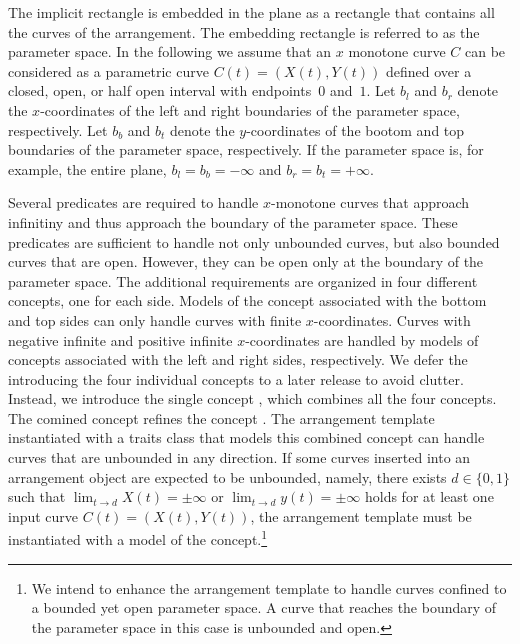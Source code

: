 The implicit rectangle is embedded in the plane as a rectangle that
contains all the curves of the arrangement. The embedding rectangle
is referred to as the parameter space. In the following we assume
that an $x$ monotone curve $C$ can be considered as a parametric
curve $C(t) = (X(t),Y(t))$ defined over a closed, open, or half open
interval with endpoints~$0$ and~$1$. Let $b_l$ and $b_r$ denote the
$x$-coordinates of the left and right boundaries of the parameter
space, respectively. Let $b_b$ and $b_t$ denote the $y$-coordinates
of the bootom and top boundaries of the parameter space, respectively.
If the parameter space is, for example, the entire plane,
$b_l = b_b = -\infty$ and $b_r = b_t = +\infty$.

Several predicates are required to handle $x$-monotone curves that
approach infinitiny and thus approach the boundary of the parameter
space. These predicates are sufficient to handle not only unbounded
curves, but also bounded curves that are open. However, they can be
open only at the boundary of the parameter space. The additional
requirements are organized in four different concepts, one for each
side. Models of the concept associated with the bottom and top sides
can only handle curves with finite $x$-coordinates. Curves with
negative infinite and positive infinite $x$-coordinates are handled by
models of concepts associated with the left and right sides,
respectively. We defer the introducing the four individual concepts to
a later release to avoid clutter. Instead, we introduce the single
concept , which combines all the
four concepts. The comined concept refines the concept
. The arrangement template
instantiated with a traits class that models this combined concept
can handle curves that are unbounded in any direction. If some
curves inserted into an arrangement object are expected to be
unbounded, namely, there exists $d \in \{0,1\}$ such that
$\lim_{t \rightarrow d}X(t) = \pm\infty$ or
$\lim_{t \rightarrow d}y(t) = \pm\infty$
holds for at least one input curve $C(t) = (X(t),Y(t))$, the arrangement
template must be instantiated with a model of the
 concept.\footnote{We
  intend to enhance the arrangement template to handle curves confined
  to a bounded yet open parameter space. A curve that reaches the
  boundary of the parameter space in this case is unbounded and open.}

